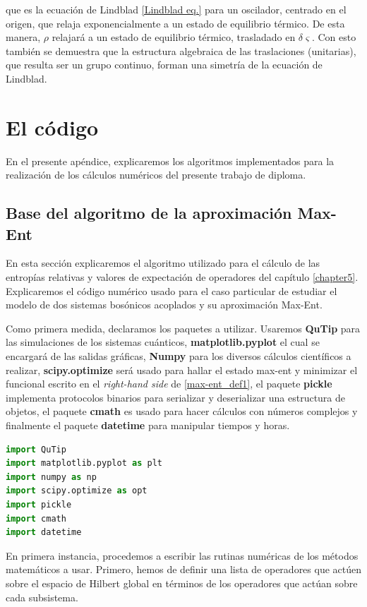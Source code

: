 \documentclass{report} %
\numberwithin{equation}{section}
\begin{document}
que es la ecuación de Lindblad \eqref{Lindblad eq.} para un oscilador, centrado en el origen, que relaja exponencialmente a un estado de equilibrio térmico. De esta manera, $\rho$ relajará a un estado de equilibrio térmico, trasladado en $\delta \varsigma$. Con esto también se demuestra que la estructura algebraica de las traslaciones (unitarias), que resulta ser un grupo continuo, forman una simetría de la ecuación de Lindblad.  

\chapter{El c\'odigo}
\label{AppendixB}

En el presente apéndice, explicaremos los algoritmos implementados para la realización de los cálculos numéricos del presente trabajo de diploma. 

\section{Base del algoritmo de la aproximaci\'on Max-Ent}

En esta sección explicaremos el algoritmo utilizado para el cálculo de las entropías relativas y valores de expectación de operadores del capítulo \ref{chapter5}. Explicaremos el código numérico usado para el caso particular de estudiar el modelo de dos sistemas bosónicos acoplados y su aproximación Max-Ent.

Como primera medida, declaramos los paquetes a utilizar. Usaremos \textbf{QuTip} para las simulaciones de los sistemas cuánticos, \textbf{matplotlib.pyplot} el cual se encargará de las salidas gráficas, \textbf{Numpy} para los diversos cálculos científicos a realizar, \textbf{scipy.optimize} será usado para hallar el estado max-ent y minimizar el funcional escrito en el \textit{right-hand side} de \eqref{max-ent_def1}, el paquete \textbf{pickle} implementa protocolos binarios para serializar y deserializar una estructura de objetos, el paquete \textbf{cmath} es usado para hacer cálculos con números complejos y finalmente el paquete \textbf{datetime} para manipular tiempos y horas.

\begin{lstlisting}[language=Python]
import QuTip 
import matplotlib.pyplot as plt 
import numpy as np 
import scipy.optimize as opt 
import pickle 
import cmath 
import datetime 
\end{lstlisting}

En primera instancia, procedemos a escribir las rutinas numéricas de los métodos matemáticos a usar. Primero, hemos de definir una lista de operadores que actúen sobre el espacio de Hilbert global en términos de los operadores que actúan sobre cada subsistema. 
\end{document}
